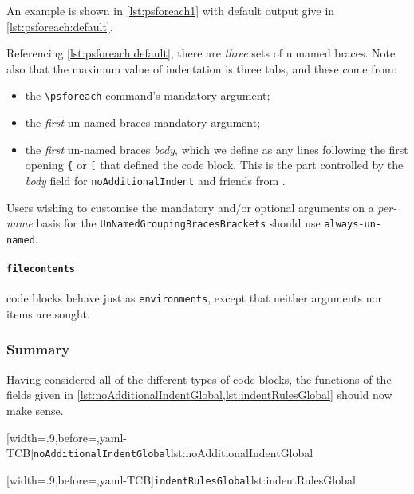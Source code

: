 		An example is shown in \cref{lst:psforeach1} with default output give in \cref{lst:psforeach:default}.

		\begin{minipage}{.45\textwidth}
		\end{minipage}%
		\hfill
		\begin{minipage}{.5\textwidth}
		\end{minipage}%

		Referencing \cref{lst:psforeach:default}, there are \emph{three} sets of unnamed braces. Note also that the maximum value
		of indentation is three tabs, and these come from:
		\begin{itemize}
			\item the \lstinline!\psforeach! command's mandatory argument;
			\item the \emph{first} un-named braces mandatory argument;
			\item the \emph{first} un-named braces \emph{body}, which we define as any lines following the first opening \lstinline!{! or \lstinline![!
			      that defined the code block.  This is the part controlled by the \emph{body} field for \texttt{noAdditionalIndent}
			      and friends from .
		\end{itemize}
		Users wishing to customise the mandatory and/or optional arguments on a \emph{per-name} basis for the \texttt{UnNamedGroupingBracesBrackets}
		should use \texttt{always-un-named}.

	\paragraph{\texttt{filecontents}} code blocks behave just as \texttt{environments}, except that neither arguments nor items are sought.


\subsubsection{Summary}
Having considered all of the different types of code blocks, the functions of the fields given in 
\cref{lst:noAdditionalIndentGlobal,lst:indentRulesGlobal} should now make sense.

\begin{widepage}
		\begin{minipage}{.5\linewidth}
		[width=.9\linewidth,before=\centering,yaml-TCB]{\texttt{noAdditionalIndentGlobal}}{lst:noAdditionalIndentGlobal}
		\end{minipage}%
        \hfill
		\begin{minipage}{.5\linewidth}
		[width=.9\linewidth,before=\centering,yaml-TCB]{\texttt{indentRulesGlobal}}{lst:indentRulesGlobal}
		\end{minipage}%
\end{widepage}
